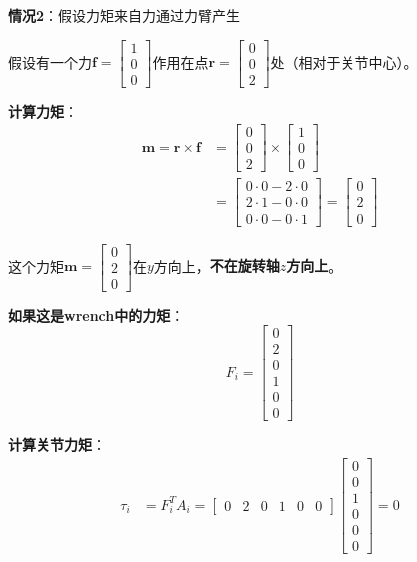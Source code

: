 \documentclass[12pt,a4paper]{article}
\begin{document}
\textbf{情况2}：假设力矩来自力通过力臂产生

假设有一个力$\bm{f} = \begin{bmatrix} 1 \\ 0 \\ 0 \end{bmatrix}$作用在点$\bm{r} = \begin{bmatrix} 0 \\ 0 \\ 2 \end{bmatrix}$处（相对于关节中心）。

\textbf{计算力矩}：
\begin{align}
\bm{m} = \bm{r} \times \bm{f} &= \begin{bmatrix} 0 \\ 0 \\ 2 \end{bmatrix} \times \begin{bmatrix} 1 \\ 0 \\ 0 \end{bmatrix} \\
&= \begin{bmatrix} 0 \cdot 0 - 2 \cdot 0 \\ 2 \cdot 1 - 0 \cdot 0 \\ 0 \cdot 0 - 0 \cdot 1 \end{bmatrix} = \begin{bmatrix} 0 \\ 2 \\ 0 \end{bmatrix}
\end{align}

这个力矩$\bm{m} = \begin{bmatrix} 0 \\ 2 \\ 0 \end{bmatrix}$在$y$方向上，\textbf{不在旋转轴$z$方向上}。

\textbf{如果这是wrench中的力矩}：
\begin{equation}
F_i = \begin{bmatrix} 0 \\ 2 \\ 0 \\ 1 \\ 0 \\ 0 \end{bmatrix}
\end{equation}

\textbf{计算关节力矩}：
\begin{align}
\tau_i &= F_i^T A_i = \begin{bmatrix} 0 & 2 & 0 & 1 & 0 & 0 \end{bmatrix} \begin{bmatrix} 0 \\ 0 \\ 1 \\ 0 \\ 0 \\ 0 \end{bmatrix} = 0
\end{align}
\end{document}
